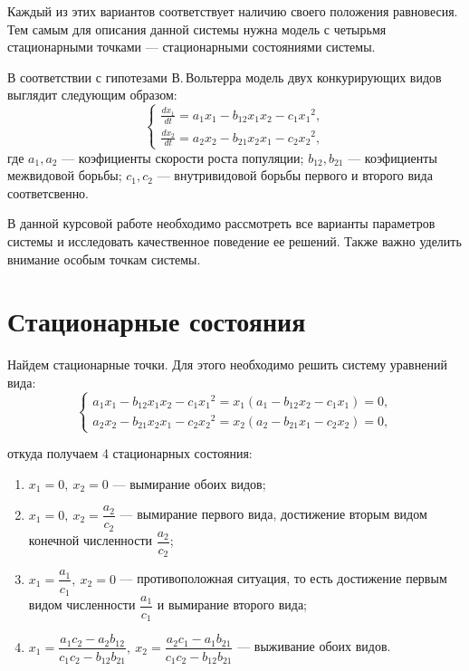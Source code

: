 \documentclass[12pt,a4paper]{article}
\begin{document}
    Каждый из этих вариантов соответствует наличию своего положения равновесия. Тем самым для описания данной системы нужна модель с четырьмя стационарными точками --- стационарными состояниями системы.

    В соответствии с гипотезами В.\,Вольтерра модель двух конкурирующих видов выглядит следующим образом:
    \begin{equation}
        \label{volterra}
        \begin{cases}
            \frac{dx_1}{dt} = a_1 x_1 - b_{12} x_1 x_2 - c_1 {x_1}\!^2,
            \\
            \frac{dx_2}{dt} = a_2 x_2 - b_{21} x_2 x_1 - c_2 {x_2}\!^2 ,
        \end{cases}
    \end{equation}
    \noindent где $a_1, a_2$ --- коэфициенты скорости роста популяции; $b_{12}, b_{21}$ --- коэфициенты межвидовой борьбы; $c_1, c_2$ --- внутривидовой борьбы первого и второго вида соответсвенно.

    В данной курсовой работе необходимо рассмотреть все варианты параметров системы и исследовать качественное поведение ее решений. Также важно уделить внимание особым точкам системы.

    \section{Стационарные состояния}

    Найдем стационарные точки. Для этого необходимо решить систему уравнений вида: 
    \begin{equation}
        \label{seps}
        \begin{cases}
            a_1 x_1 - b_{12} x_1 x_2 - c_1 {x_1}\!^2 = x_1 (a_1 - b_{12} x_2 - c_1 x_1) = 0,
            \\
            a_2 x_2 - b_{21} x_2 x_1 - c_2 {x_2}\!^2 = x_2 (a_2 - b_{21} x_1 - c_2 x_2) = 0,
        \end{cases}
    \end{equation}
    
    \noindent откуда получаем 4 стационарных состояния:
    \begin{enumerate}
        \setlength\itemsep{0.5em}
        \item $ x_1 = 0,\ x_2 = 0 $ --- вымирание обоих видов;
        \item $ x_1 = 0,\ x_2 = \dfrac{a_2}{c_2} $ --- вымирание первого вида, достижение вторым видом конечной численности $ \dfrac{a_2}{c_2} $;
        \item $ x_1 = \dfrac{a_1}{c_1},\ x_2 = 0 $ --- противоположная ситуация, то есть достижение первым видом численности $ \dfrac{a_1}{c_1} $ и вымирание второго вида;
        \item $ x_1 = \dfrac{a_1 c_2 - a_2 b_{12}}{c_1 c_2 - b_{12} b_{21}},\ x_2 = \dfrac{a_2 c_1 - a_1 b_{21}}{c_1 c_2 - b_{12} b_{21}}$ --- выживание обоих видов.
    \end{enumerate} 
\end{document}

